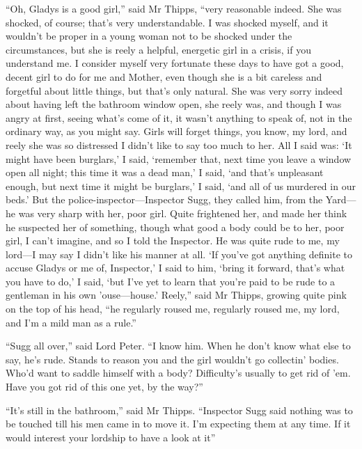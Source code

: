 \enquote{Oh, Gladys is a good girl,} said Mr Thipps, \enquote{very reasonable indeed. She was shocked, of course; that’s very understandable. I was shocked myself, and it wouldn’t be proper in a young woman not to be shocked under the circumstances, but she is reely a helpful, energetic girl in a crisis, if you understand me. I consider myself very fortunate these days to have got a good, decent girl to do for me and Mother, even though she is a bit careless and forgetful about little things, but that’s only natural. She was very sorry indeed about having left the bathroom window open, she reely was, and though I was angry at first, seeing what’s come of it, it wasn’t anything to speak of, not in the ordinary way, as you might say. Girls will forget things, you know, my lord, and reely she was so distressed I didn’t like to say too much to her. All I said was: \enquote{It might have been burglars,} I said, \enquote{remember that, next time you leave a window open all night; this time it was a dead man,} I said, \enquote{and that’s unpleasant enough, but next time it might be burglars,} I said, \enquote{and all of us murdered in our beds.} But the police-inspector\allowbreak---\allowbreak Inspector Sugg, they called him, from the Yard\allowbreak---\allowbreak he was very sharp with her, poor girl. Quite frightened her, and made her think he suspected her of something, though what good a body could be to her, poor girl, I can’t imagine, and so I told the Inspector. He was quite rude to me, my lord\allowbreak---\allowbreak I may say I didn’t like his manner at all. \enquote{If you’ve got anything definite to accuse Gladys or me of, Inspector,} I said to him, \enquote{bring it forward, that’s what you have to do,} I said, \enquote{but I’ve yet to learn that you’re paid to be rude to a gentleman in his own ’ouse\allowbreak---\allowbreak house.} Reely,} said Mr Thipps, growing quite pink on the top of his head, \enquote{he regularly roused me, regularly roused me, my lord, and I’m a mild man as a rule.}

\enquote{Sugg all over,} said Lord Peter. \enquote{I know him. When he don’t know what else to say, he’s rude. Stands to reason you and the girl wouldn’t go collectin’ bodies. Who’d want to saddle himself with a body? Difficulty’s usually to get rid of ’em. Have you got rid of this one yet, by the way?}

\enquote{It’s still in the bathroom,} said Mr Thipps. \enquote{Inspector Sugg said nothing was to be touched till his men came in to move it. I’m expecting them at any time. If it would interest your lordship to have a look at it\longdash}

